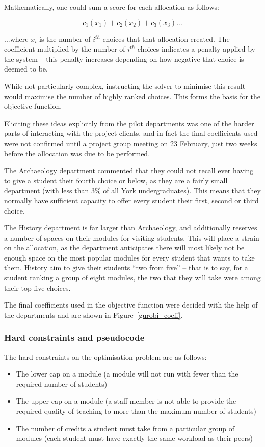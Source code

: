 Mathematically, one could sum a score for each allocation as follows:

$$
c_1(x_1) + c_2(x_2) + c_3(x_3) ...
$$

...where $x_i$ is the number of $i^{th}$ choices that that allocation created.
The coefficient multiplied by the number of $i^{th}$ choices indicates a
penalty applied by the system -- this penalty increases depending on how
negative that choice is deemed to be.

While not particularly complex, instructing the solver to minimise this result
would maximise the number of highly ranked choices. This forms the basis for
the objective function.

Eliciting these ideas explicitly from the pilot departments was one of the
harder parts of interacting with the project clients, and in fact the final
coefficients used were not confirmed until a project group meeting on 23
February, just two weeks before the allocation was due to be performed.

The Archaeology department commented that they could not recall ever having to
give a student their fourth choice or below, as they are a fairly small
department (with less than 3\% of all York undergraduates). This means that
they normally have sufficient capacity to offer every student their first,
second or third choice.

The History department is far larger than Archaeology, and additionally
reserves a number of spaces on their modules for visiting students. This will
place a strain on the allocation, as the department anticipates there will
most likely not be enough space on the most popular modules for every student
that wants to take them. History aim to give their students ``two from five''
-- that is to say, for a student ranking a group of eight modules, the two
that they will take were among their top five choices.

The final coefficients used in the objective function were decided with the
help of the departments and are shown in Figure~\ref{gurobi_coeff}.

\subsubsection{Hard constraints and pseudocode}

The hard constraints on the optimisation problem are as follows:

\begin{itemize}
  \item The lower cap on a module (a module will not run with fewer than the
        required number of students)
  \item The upper cap on a module (a staff member is not able to provide the
        required quality of teaching to more than the maximum number of students)
  \item The number of credits a student must take from a particular group of
        modules (each student must have exactly the same workload as their
        peers)
\end{itemize}

